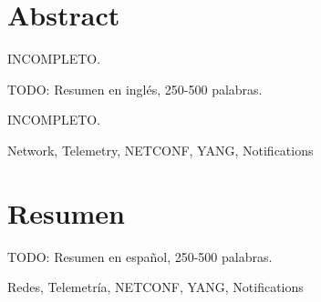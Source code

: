 \chapter*{Abstract}
\Large{INCOMPLETO.}
\begin{abstractEn}
TODO: Resumen en inglés, 250-500 palabras.


\end{abstractEn}
\Large{INCOMPLETO.}
\begin{keywordsEn}
Network, Telemetry, NETCONF, YANG, Notifications
\end{keywordsEn}

\chapter*{Resumen}

\begin{abstractEs}
TODO: Resumen en español, 250-500 palabras.


\end{abstractEs}

\begin{keywordsEs}
Redes, Telemetría, NETCONF, YANG, Notifications
\end{keywordsEs}

